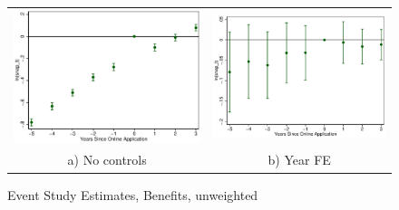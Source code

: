 \documentclass[11pt,letterpaper]{article}
\begin{document}
\begin{figure}\caption{Event Study Estimates, Benefits, unweighted}
\begin{tabular}{cc}
\includegraphics[scale=0.57]{tabfig/evstu_snap_t_one_notr_5_3}&\includegraphics[scale=0.57]{tabfig/evstu_snap_t_one_year_5_3}\\
a) No controls&b) Year FE\\

\end{tabular}
\end{figure}
\end{document}
